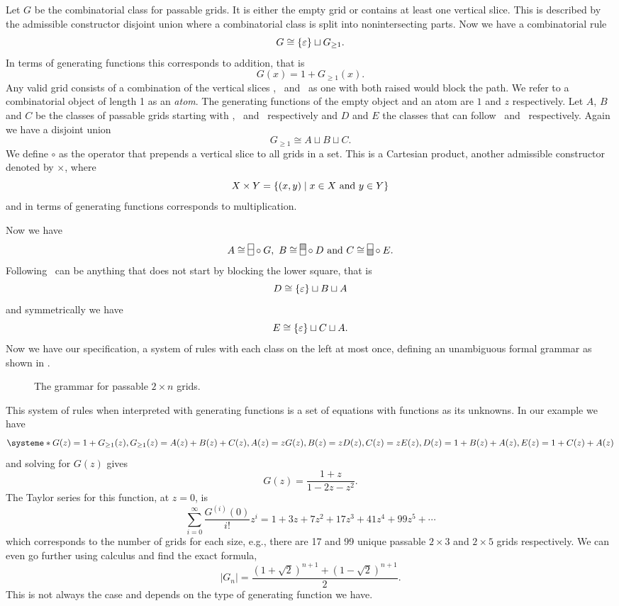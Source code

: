 Let $G$ be the combinatorial class for passable grids. It is either the empty grid or contains at least one vertical slice. This is described by the admissible constructor disjoint union where a combinatorial class is split into nonintersecting parts. Now we have a combinatorial rule 
\[
    G \cong \left\{\varepsilon\right\} \sqcup G_{\geq 1}.
\]
In terms of generating functions this corresponds to addition, that is 
\[
    G(x) = 1 + G_{\geq1}(x).
\] 
Any valid grid consists of a combination of the vertical slices \gridN, \gridU\ and \gridD\ as one with both raised would block the path. We refer to a combinatorial object of length 1 as an \emph{atom}. The generating functions of the empty object and an atom are $1$ and $z$ respectively. Let $A$, $B$ and $C$ be the classes of passable grids starting with \gridN, \gridU\ and \gridD\ respectively and $D$ and $E$ the classes that can follow \gridU\ and \gridD\ respectively. Again we have a disjoint union 
\[
    G_{\geq1} \cong A \sqcup B \sqcup C.
\]
We define $\circ$ as the operator that prepends a vertical slice to all grids in a set. This is a Cartesian product, another admissible constructor denoted by $\times$, where
\[
X \times Y = \left\{(x,y) \mid x\in X \text{ and } y \in Y\right\}
\]
and in terms of generating functions corresponds to multiplication.

Now we have 
\[
    A \cong \gridN \circ G, \ B \cong \gridU \circ D \text{ and } C \cong \gridD \circ E.
\]
Following \gridU\ can be anything that does not start by blocking the lower square, that is 
\[
    D \cong \left\{\varepsilon\right\} \sqcup B \sqcup A
\]
and symmetrically we have 
\[
    E \cong \left\{\varepsilon\right\} \sqcup C \sqcup A.
\]
Now we have our specification, a system of rules with each class on the left at most once, defining an unambiguous formal grammar as shown in .

\begin{figure}[ht!]
    \centering
    
    \caption{The grammar for passable $2\times n$ grids.}
    \label{fig:gridtree}
\end{figure}

This system of rules when interpreted with generating functions is a set of equations with functions as its unknowns. In our example we have
\[
    \systeme*{G(z) = 1 + G_{\geq1}(z), G_{\geq1}(z) = A(z) + B(z) + C(z),A(z) = zG(z), B(z) = zD(z), C(z) = zE(z), D(z) = 1+B(z)+A(z), E(z) = 1+C(z)+A(z)}
\]
and solving for $G(z)$ gives 
\[
    G(z) = \frac{1+z}{1-2z-z^2}.
\]
The Taylor series for this function, at $z=0$, is
\[
    \sum_{i=0}^\infty \frac{G^{(i)}(0)}{i!}z^i = 1+3z+7z^2+17z^3+ 41z^4 + 99z^5 + \dotsm
\]
which corresponds to the number of grids for each size, e.g., there are 17 and 99 unique passable $2\times3$ and $2\times5$ grids respectively. We can even go further using calculus and find the exact formula, 
\[
|G_n| = \frac{\left(1+\sqrt{2}\right)^{n+1} + \left(1-\sqrt{2}\right)^{n+1}}{2}.
\]
This is not always the case and depends on the type of generating function we have.

